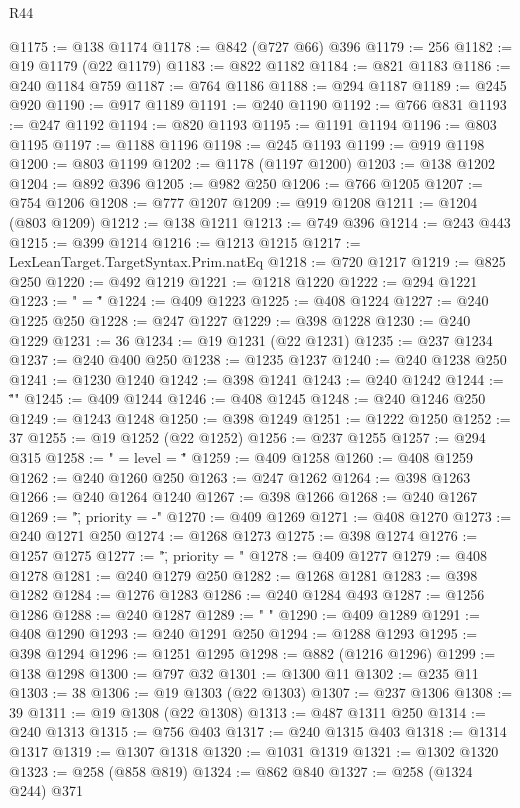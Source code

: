 \begin{lexlean}{R44}
\begin{coremodule}
@1175 := @138 @1174
@1178 := @842 (@727 @66) @396
@1179 := 256
@1182 := @19 @1179 (@22 @1179)
@1183 := @822 @1182
@1184 := @821 @1183
@1186 := @240 @1184 @759
@1187 := @764 @1186
@1188 := @294 @1187
@1189 := @245 @920
@1190 := @917 @1189
@1191 := @240 @1190
@1192 := @766 @831
@1193 := @247 @1192
@1194 := @820 @1193
@1195 := @1191 @1194
@1196 := @803 @1195
@1197 := @1188 @1196
@1198 := @245 @1193
@1199 := @919 @1198
@1200 := @803 @1199
@1202 := @1178 (@1197 @1200)
@1203 := @138 @1202
@1204 := @892 @396
@1205 := @982 @250
@1206 := @766 @1205
@1207 := @754 @1206
@1208 := @777 @1207
@1209 := @919 @1208
@1211 := @1204 (@803 @1209)
@1212 := @138 @1211
@1213 := @749 @396
@1214 := @243 @443
@1215 := @399 @1214
@1216 := @1213 @1215
@1217 := LexLeanTarget.TargetSyntax.Prim.natEq
@1218 := @720 @1217
@1219 := @825 @250
@1220 := @492 @1219
@1221 := @1218 @1220
@1222 := @294 @1221
@1223 := " = \""
@1224 := @409 @1223
@1225 := @408 @1224
@1227 := @240 @1225 @250
@1228 := @247 @1227
@1229 := @398 @1228
@1230 := @240 @1229
@1231 := 36
@1234 := @19 @1231 (@22 @1231)
@1235 := @237 @1234
@1237 := @240 @400 @250
@1238 := @1235 @1237
@1240 := @240 @1238 @250
@1241 := @1230 @1240
@1242 := @398 @1241
@1243 := @240 @1242
@1244 := "\"\n"
@1245 := @409 @1244
@1246 := @408 @1245
@1248 := @240 @1246 @250
@1249 := @1243 @1248
@1250 := @398 @1249
@1251 := @1222 @1250
@1252 := 37
@1255 := @19 @1252 (@22 @1252)
@1256 := @237 @1255
@1257 := @294 @315
@1258 := " = { level = \""
@1259 := @409 @1258
@1260 := @408 @1259
@1262 := @240 @1260 @250
@1263 := @247 @1262
@1264 := @398 @1263
@1266 := @240 @1264 @1240
@1267 := @398 @1266
@1268 := @240 @1267
@1269 := "\", priority = -"
@1270 := @409 @1269
@1271 := @408 @1270
@1273 := @240 @1271 @250
@1274 := @1268 @1273
@1275 := @398 @1274
@1276 := @1257 @1275
@1277 := "\", priority = "
@1278 := @409 @1277
@1279 := @408 @1278
@1281 := @240 @1279 @250
@1282 := @1268 @1281
@1283 := @398 @1282
@1284 := @1276 @1283
@1286 := @240 @1284 @493
@1287 := @1256 @1286
@1288 := @240 @1287
@1289 := " }\n"
@1290 := @409 @1289
@1291 := @408 @1290
@1293 := @240 @1291 @250
@1294 := @1288 @1293
@1295 := @398 @1294
@1296 := @1251 @1295
@1298 := @882 (@1216 @1296)
@1299 := @138 @1298
@1300 := @797 @32
@1301 := @1300 @11
@1302 := @235 @11
@1303 := 38
@1306 := @19 @1303 (@22 @1303)
@1307 := @237 @1306
@1308 := 39
@1311 := @19 @1308 (@22 @1308)
@1313 := @487 @1311 @250
@1314 := @240 @1313
@1315 := @756 @403
@1317 := @240 @1315 @403
@1318 := @1314 @1317
@1319 := @1307 @1318
@1320 := @1031 @1319
@1321 := @1302 @1320
@1323 := @258 (@858 @819)
@1324 := @862 @840
@1327 := @258 (@1324 @244) @371

\end{coremodule}
\end{lexlean}
